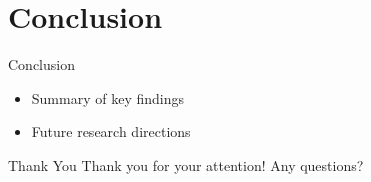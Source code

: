 \documentclass[
    NAME={Dr. Helga Ingimundardóttir},
    EMAIL={helgaingim@hi.is},
    FACULTY={Industrial Engineering Department},
    PRETITLE={Pushing Boundaries},
    TITLE={A Data-Driven Dive into `Legend of the Ice People'},
    SUBTITLE={Unravel the unexpected synergy of literature and data science},
    SEMINAR={Haustráðstefna Advania},
    DATE={September 8, 2023}
    ]{hi-latex/hi-beamer}
\begin{document}
\section{Conclusion}
\begin{frame}{Conclusion}
  \begin{itemize}
    \item Summary of key findings
    \item Future research directions
  \end{itemize}
\end{frame}

\begin{frame}{Thank You}
  Thank you for your attention! Any questions?
\end{frame}
\end{document}
